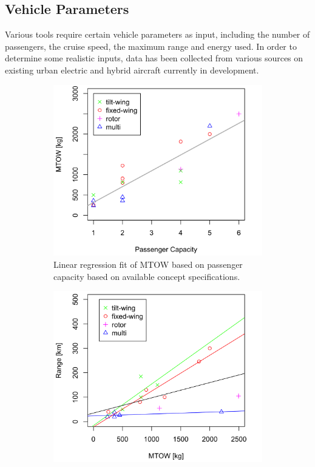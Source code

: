 \vspace{-1mm}

\subsection{Vehicle Parameters}\label{stats}
Various tools require certain vehicle parameters as input, including the number of passengers, the cruise speed, the maximum range and energy used. In order to determine some realistic inputs, data has been collected from various sources on existing urban electric and hybrid aircraft currently in development.

\vspace{-4mm}

\begin{figure}[H]
\begin{subfigure}[t]{0.5\textwidth}
    \centering
    \includegraphics[width=\textwidth]{Figures/MTOW-Pax.png}
    \captionsetup{width=.8\linewidth}
    \caption{Linear regression fit of MTOW based on passenger capacity based on available concept specifications.}
    \label{fig:MTOW-Pax}
\end{subfigure}
\begin{subfigure}[t]{0.5\textwidth}
    \centering
    \includegraphics[width=\textwidth]{Figures/MTOW-Range.png}

\end{subfigure}
\end{figure}
